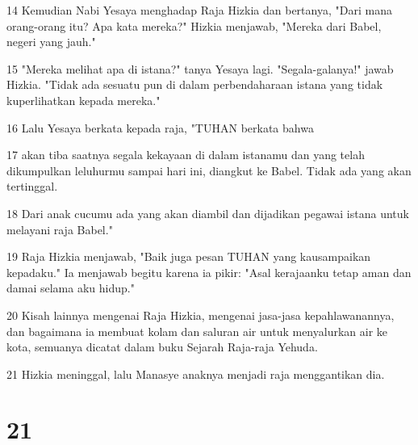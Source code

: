 \par 14 Kemudian Nabi Yesaya menghadap Raja Hizkia dan bertanya, "Dari mana orang-orang itu? Apa kata mereka?" Hizkia menjawab, "Mereka dari Babel, negeri yang jauh."
\par 15 "Mereka melihat apa di istana?" tanya Yesaya lagi. "Segala-galanya!" jawab Hizkia. "Tidak ada sesuatu pun di dalam perbendaharaan istana yang tidak kuperlihatkan kepada mereka."
\par 16 Lalu Yesaya berkata kepada raja, "TUHAN berkata bahwa
\par 17 akan tiba saatnya segala kekayaan di dalam istanamu dan yang telah dikumpulkan leluhurmu sampai hari ini, diangkut ke Babel. Tidak ada yang akan tertinggal.
\par 18 Dari anak cucumu ada yang akan diambil dan dijadikan pegawai istana untuk melayani raja Babel."
\par 19 Raja Hizkia menjawab, "Baik juga pesan TUHAN yang kausampaikan kepadaku." Ia menjawab begitu karena ia pikir: "Asal kerajaanku tetap aman dan damai selama aku hidup."
\par 20 Kisah lainnya mengenai Raja Hizkia, mengenai jasa-jasa kepahlawanannya, dan bagaimana ia membuat kolam dan saluran air untuk menyalurkan air ke kota, semuanya dicatat dalam buku Sejarah Raja-raja Yehuda.
\par 21 Hizkia meninggal, lalu Manasye anaknya menjadi raja menggantikan dia.

\chapter{21}

